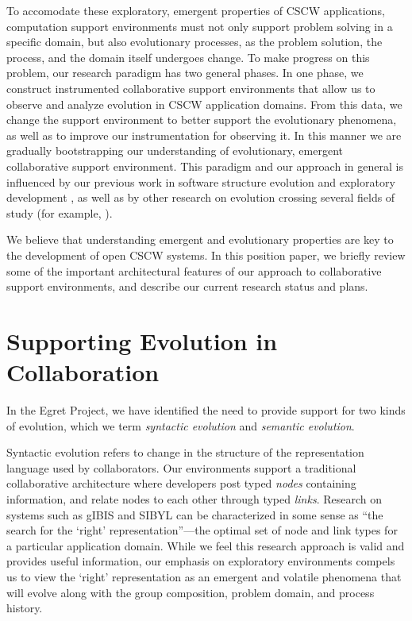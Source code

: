 To accomodate these exploratory, emergent properties of CSCW
applications, computation support environments must not only support
problem solving in a specific domain, but also evolutionary processes,
as the problem solution, the process, and the domain itself undergoes
change.  To make progress on this problem, our research paradigm has two
general phases.  In one phase, we construct instrumented collaborative
support environments that allow us to observe and analyze evolution in
CSCW application domains.  From this data, we change the support
environment to better support the evolutionary phenomena, as well as
to improve our instrumentation for observing it.  In this manner we
are gradually bootstrapping our understanding of evolutionary,
emergent collaborative support environment.  This paradigm and our
approach in general is influenced by our previous work in software
structure evolution and exploratory development
\cite{Johnson89b,Johnson90,Johnson91}, as well as by other research 
on evolution crossing several fields of study
(for example, \cite{Salthe85,Skarra87,Lehman85,Beer85}). 

We believe that understanding emergent and evolutionary properties are
key to the development of open CSCW systems.  In this position paper,
we briefly review some of the important architectural features of our
approach to collaborative support environments, and describe our
current research status and plans.

\section*{Supporting Evolution in Collaboration}

In the Egret Project, we have identified the need to provide support
for two kinds of evolution, which we term {\em syntactic evolution}
and {\em semantic evolution}.

Syntactic evolution refers to change in the structure of the
representation language used by collaborators.  Our environments
support a traditional collaborative architecture where developers post
typed {\sl nodes} containing information, and relate nodes to each
other through typed {\sl links}.  Research on systems such as gIBIS
\cite{Conklin88} and SIBYL \cite{Lee90} can be characterized in some
sense as ``the search for the `right' representation''---the optimal
set of node and link types for a particular application domain.  While
we feel this research approach is valid and provides useful
information, our emphasis on exploratory environments compels us to
view the `right' representation as an emergent and volatile phenomena
that will evolve along with the group composition, problem domain, and
process history.

